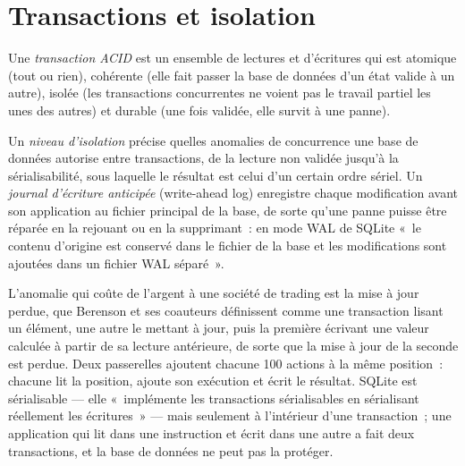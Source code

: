 \section{Transactions et isolation}

\begin{definition}\label{def:pl:databases-and-sql:acid}
Une \emph{transaction ACID} est un ensemble de lectures et d'écritures qui est atomique (tout ou rien), cohérente (elle fait passer la
base de données d'un état valide à un autre), isolée (les transactions concurrentes ne voient pas le travail partiel les unes des autres) et durable (une fois validée,
elle survit à une panne).
\end{definition}

\begin{definition}\label{def:pl:databases-and-sql:isolation}
Un \emph{niveau d'isolation} précise quelles anomalies de concurrence une base de données autorise entre transactions, de la
lecture non validée jusqu'à la sérialisabilité, sous laquelle le résultat est celui d'un certain ordre sériel. Un \emph{journal d'écriture anticipée} (write-ahead log) enregistre chaque
modification avant son application au fichier principal de la base, de sorte qu'une panne puisse être réparée en la rejouant ou en la supprimant~: en mode WAL de SQLite
«~le contenu d'origine est conservé dans le fichier de la base et les modifications sont ajoutées dans un fichier WAL séparé~».
\end{definition}

L'anomalie qui coûte de l'argent à une société de trading est la mise à jour perdue, que Berenson et ses coauteurs définissent comme une transaction lisant un élément,
une autre le mettant à jour, puis la première écrivant une valeur calculée à partir de sa lecture antérieure, de sorte que la mise à jour de la seconde est perdue. Deux passerelles
ajoutent chacune 100 actions à la même position~: chacune lit la position, ajoute son exécution et écrit le résultat. SQLite est sérialisable --- elle
«~implémente les transactions sérialisables en sérialisant réellement les écritures~» --- mais seulement à l'intérieur d'une transaction~; une
application qui lit dans une instruction et écrit dans une autre a fait deux transactions, et la base de données ne peut pas la protéger.

\label{lst:pl:databases-and-sql:lost}

